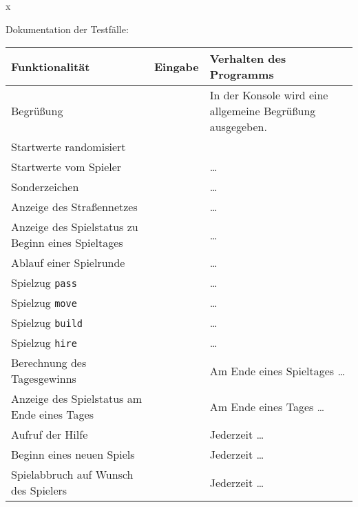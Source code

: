 \documentclass[a4paper]{article}
\begin{document}
\begin{exercise}{x}

Dokumentation der Testf\"alle:


\begin{center}
\begin{tabular}{| p{2.5cm} | p{2.2cm} | p{10cm} |}
		\hline
		Funktionalit\"at & Eingabe & Verhalten des Programms\\ \hline \hline
		
		Begr\"u\ss{}ung & 
		& In der Konsole wird eine allgemeine Begr\"u\ss{}ung ausgegeben. \\ \hline
		
		Startwerte randomisiert & 
		& \\ \hline
		
		Startwerte vom Spieler & 
		& \dots \\ \hline
		
		Sonderzeichen &
		& \dots \\ \hline
		
		Anzeige des Stra\ss{}ennetzes &
		& \dots \\ \hline
		
		Anzeige des Spielstatus zu Beginn eines Spieltages &
		& \dots \\ \hline
		
		Ablauf einer Spielrunde &
		& \dots \\ \hline

		Spielzug \texttt{pass} &
		& \dots \\ \hline
		
		Spielzug \texttt{move} &
		& \dots \\ \hline
		
		Spielzug \texttt{build} &
		& \dots \\ \hline
		
		Spielzug \texttt{hire} &
		& \dots \\ \hline
		
		Berechnung des Tagesgewinns &
		& Am Ende eines Spieltages \dots \\ \hline
		
		Anzeige des Spielstatus am Ende eines Tages &
		& Am Ende eines Tages \dots \\ \hline
		
		Aufruf der Hilfe &
		& Jederzeit \dots \\ \hline
	
		Beginn eines neuen Spiels &
		& Jederzeit \dots \\ \hline
		
		Spielabbruch auf Wunsch des Spielers &
		& Jederzeit \dots \\ \hline
		

\end{tabular}
\end{center}
\end{exercise}
\end{document}
